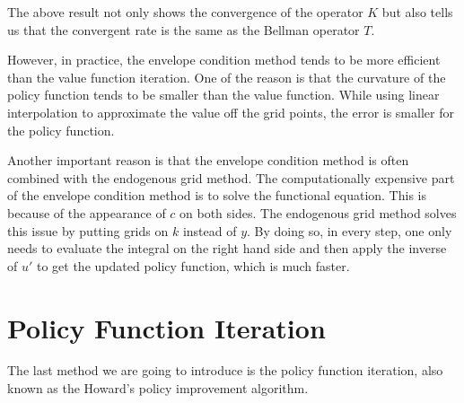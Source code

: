 \documentclass[12pt]{article}
\begin{document}
The above result not only shows the convergence of the
operator $K$ but also tells us that the convergent rate 
is the same as the Bellman operator $T$. 

However, in practice, the envelope condition method tends 
to be more efficient than the value function iteration. 
One of the reason is that the curvature of the policy 
function tends to be smaller than the value function. 
While using linear interpolation to approximate the 
value off the grid points, the error is smaller for
the policy function. 

Another important reason is that the envelope condition 
method is often combined with the endogenous grid method. 
The computationally expensive part of the envelope 
condition method is to solve the functional equation. 
This is because of the appearance of $c$ on both sides. 
The endogenous grid method solves this issue by putting 
grids on $k$ instead of $y$. By doing so, in every step, 
one only needs to evaluate the integral on the right hand 
side and then apply the inverse of $u'$ to get the 
updated policy function, which is much faster.



\section{Policy Function Iteration}
The last method we are going to introduce is the policy 
function iteration, also known as the Howard's policy 
improvement algorithm. 
\end{document}

